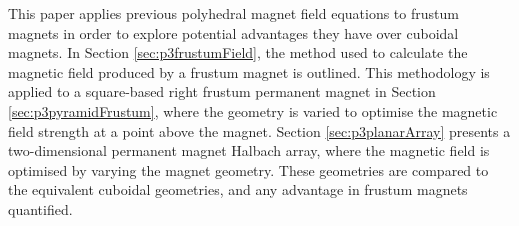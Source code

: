 This paper applies previous polyhedral magnet field equations to frustum magnets in order to explore potential advantages they have over cuboidal magnets. In Section \ref{sec:p3frustumField}, the method used to calculate the magnetic field produced by a frustum magnet is outlined. This methodology is applied to a square-based right frustum permanent magnet in Section \ref{sec:p3pyramidFrustum}, where the geometry is varied to optimise the magnetic field strength at a point above the magnet. Section \ref{sec:p3planarArray} presents a two-dimensional permanent magnet Halbach array, where the magnetic field is optimised by varying the magnet geometry. These geometries are compared to the equivalent cuboidal geometries, and any advantage in frustum magnets quantified.